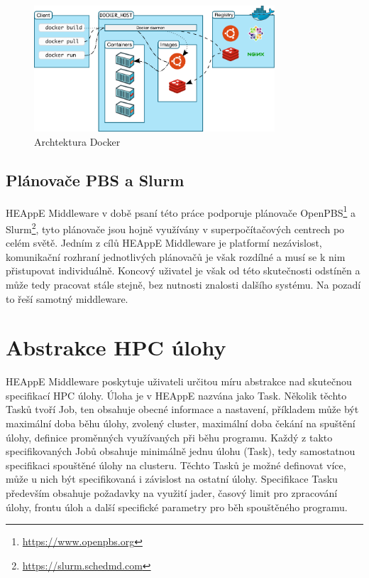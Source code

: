 \begin{figure}
	\centering
	\includegraphics[width=0.8\textwidth]{Figures/docker-architecture.png}
	\caption{Archtektura Docker \cite{Ued4tuEOQL0cOIeN}}
	\label{fig:docker-architecture}
\end{figure}

\subsection{Plánovače PBS a Slurm}\label{subsection:heappe-support-schedulers}
HEAppE Middleware v době psaní této práce podporuje plánovače OpenPBS\footnote{\href{https://www.openpbs.org}{https://www.openpbs.org}} a Slurm\footnote{\href{https://slurm.schedmd.com}{https://slurm.schedmd.com}}, tyto plánovače jsou hojně využívány v superpočítačových centrech po celém světě. Jedním z cílů HEAppE Middleware je platformí nezávislost, komunikační rozhraní jednotlivých plánovačů je však rozdílné a musí se k nim přistupovat individuálně. Koncový uživatel je však od této skutečnosti odstíněn a může tedy pracovat stále stejně, bez nutnosti znalosti dalšího systému. Na pozadí to řeší samotný middleware.


\section{Abstrakce HPC úlohy}
HEAppE Middleware poskytuje uživateli určitou míru abstrakce nad skutečnou specifikací HPC úlohy. Úloha je v HEAppE nazvána jako Task. Několik těchto Tasků tvoří Job, ten obsahuje obecné informace a nastavení, příkladem může být maximální doba běhu úlohy, zvolený cluster, maximální doba čekání na spuštění úlohy, definice proměnných využívaných při běhu programu. Každý z takto specifikovaných Jobů obsahuje minimálně jednu úlohu (Task), tedy samostatnou specifikaci spouštěné úlohy na clusteru. Těchto Tasků je možné definovat více, může u nich být specifikovaná i závislost na ostatní úlohy. Specifikace Tasku především obsahuje požadavky na využití jader, časový limit pro zpracování úlohy, frontu úloh a další specifické parametry pro běh spouštěného programu.

